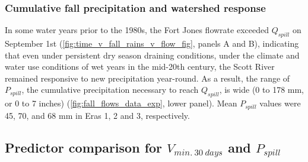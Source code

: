 \documentclass[hess, manuscript]{copernicus}
\begin{document}
\subsubsection{Cumulative fall precipitation and watershed response}

In some water years prior to the 1980s, the Fort Jones flowrate exceeded
\(Q_{spill}\) on September 1st
(\autoref{fig:time_v_fall_rains_v_flow_fig}, panels A and B), indicating
that even under persistent dry season draining conditions, under the
climate and water use conditions of wet years in the mid-20th century,
the Scott River remained responsive to new precipitation year-round. As
a result, the range of \(P_{spill}\), the cumulative precipitation
necessary to reach \(Q_{spill}\), is wide (0 to 178 mm, or 0 to 7
inches) (\autoref{fig:fall_flows_data_exp}, lower panel). Mean
\(P_{spill}\) values were 45, 70, and 68 mm in Eras 1, 2 and 3,
respectively.

\subsection{\texorpdfstring{Predictor comparison for
\(V_{min.~30~days}\) and
\(P_{spill}\)}{Predictor comparison for V\_\{min.\textasciitilde30\textasciitilde days\} and P\_\{spill\}}}
\end{document}
